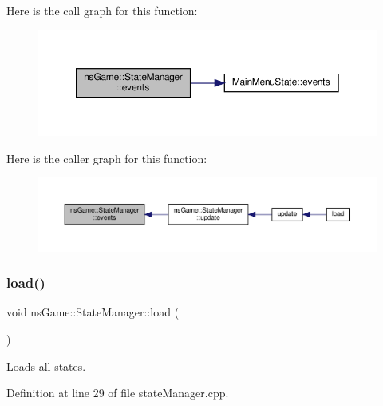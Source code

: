 Here is the call graph for this function\+:\nopagebreak
\begin{figure}[H]
\begin{center}
\leavevmode
\includegraphics[width=350pt]{classns_game_1_1_state_manager_acc7933a4b2160d8058789e24c0bd3cc6_cgraph}
\end{center}
\end{figure}
Here is the caller graph for this function\+:\nopagebreak
\begin{figure}[H]
\begin{center}
\leavevmode
\includegraphics[width=350pt]{classns_game_1_1_state_manager_acc7933a4b2160d8058789e24c0bd3cc6_icgraph}
\end{center}
\end{figure}
\mbox{\label{classns_game_1_1_state_manager_a337170555d3a9a71cbc16c30a8364981}} 
\subsubsection{\texorpdfstring{load()}{load()}}
{\footnotesize\ttfamily void ns\+Game\+::\+State\+Manager\+::load (\begin{DoxyParamCaption}{ }\end{DoxyParamCaption})}



Loads all states. 



Definition at line 29 of file state\+Manager.\+cpp.

